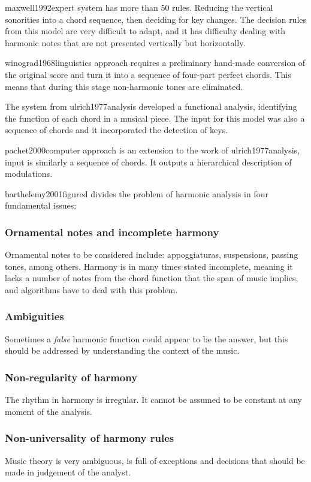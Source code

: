 		maxwell1992expert system has more than 50 rules. Reducing the vertical sonorities into a chord sequence, then deciding for key changes. The decision rules from this model are very difficult to adapt, and it has difficulty dealing with harmonic notes that are not presented vertically but horizontally.

		winograd1968linguistics approach requires a preliminary hand-made conversion of the original score and turn it into a sequence of four-part perfect chords. This means that during this stage non-harmonic tones are eliminated.

		The system from ulrich1977analysis developed a functional analysis, identifying the function of each chord in a musical piece. The input for this model was also a sequence of chords and it incorporated the detection of keys.

		pachet2000computer approach is an extension to the work of ulrich1977analysis, input is similarly a sequence of chords. It outputs a hierarchical description of modulations.

	barthelemy2001figured divides the problem of harmonic analysis in four fundamental issues:
	\subsubsection{Ornamental notes and incomplete harmony}
			Ornamental notes to be considered include: appoggiaturas, suspensions, passing tones, among others.
			Harmony is in many times stated incomplete, meaning it lacks a number of notes from the chord function that the span of music implies, and algorithms have to deal with this problem.
	\subsubsection{Ambiguities}
			Sometimes a \emph{false} harmonic function could appear to be the answer, but this should be addressed by understanding the context of the music.
	\subsubsection{Non-regularity of harmony}
			The rhythm in harmony is irregular. It cannot be assumed to be constant at any moment of the analysis.
	\subsubsection{Non-universality of harmony rules}
			Music theory is very ambiguous, is full of exceptions and decisions that should be made in judgement of the analyst.
